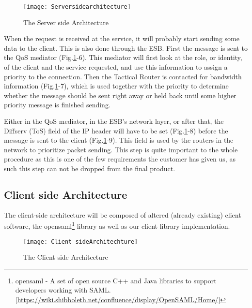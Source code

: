         \begin{figure}[htb]
            \texttt{[image: Serversidearchitecture]}
            \caption{The Server side Architecture}
            \label{fig:Serversidearchitecture}
        \end{figure}

        When the request is received at the service, it will probably start sending some data to the client. This is also done through the ESB. First the message is sent to the QoS mediator (Fig.\ref{fig:Serversidearchitecture}-6). This mediator will first look at the role, or identity, of the client and the service requested, and use this information to assign a priority to the connection. Then the Tactical Router is contacted for bandwidth information (Fig.\ref{fig:Serversidearchitecture}-7), which is used together with the priority to determine whether the message should be sent right away or held back until some higher priority message is finished sending.

        Either in the QoS mediator, in the ESB’s network layer, or after that, the Diffserv (ToS) field of the IP header will have to be set (Fig.\ref{fig:Serversidearchitecture}-8) before the message is sent to the client (Fig.\ref{fig:Serversidearchitecture}-9). This field is used by the routers in the network to prioritize packet sending. This step is quite important to the whole procedure as this is one of the few requirements the customer has given us, as such this step can not be dropped from the final product.
 
    \subsection{Client side Architecture}\label{Client side Architecture} 
    
        The client-side architecture will be composed of altered (already existing) client software, the \gls{opensaml}\footnote{\gls{opensaml} - A set of open source C++ and Java libraries to support developers working with SAML. [\url{https://wiki.shibboleth.net/confluence/display/OpenSAML/Home/}]} library as well as our client library implementation.
        
        \begin{figure}[htb]
            \centering
            \texttt{[image: Client-sideArchitechture]}
            \caption{The Client side Architecture}
            \label{fig:Client-sideArchitechture}
        \end{figure}
 
